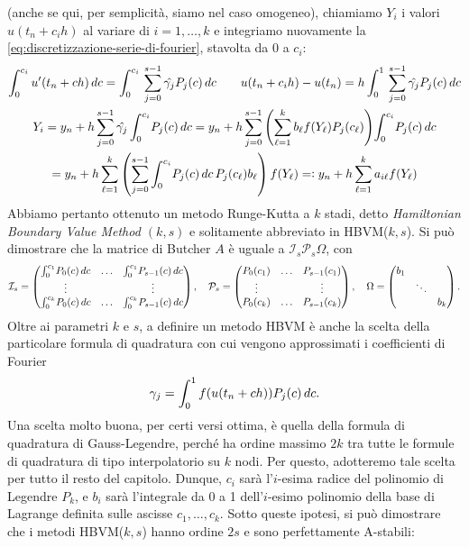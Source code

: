 (anche se qui, per semplicità, siamo nel caso omogeneo), chiamiamo $Y_i$
i valori $u(t_n + c_i h)$ al variare di $i = 1,\dots,k$ e integriamo nuovamente
la \eqref{eq:discretizzazione-serie-di-fourier}, stavolta da $0$ a $c_i$:
\begin{gather*}
\int_0^{c_i} u'(t_n+ch) \, dc
= \int_0^{c_i} \, \sum_{j=0}^{s-1} \hat{\gamma_j} P_j(c) \, dc
\qquad u(t_n + c_i h) - u(t_n)
= h \int_0^1 \, \sum_{j=0}^{s-1} \hat{\gamma_j} P_j(c) \, dc \\
Y_i
= y_n + h \sum_{j=0}^{s-1} \hat{\gamma_j} \int_0^{c_i} \! P_j(c) \, dc
= y_n + h \sum_{j=0}^{s-1}
	\left( \sum_{\ell=1}^k b_\ell f(Y_\ell) P_j(c_\ell) \right)
	\! \int_0^{c_i} \! P_j(c) \, dc \\
= y_n + h \sum_{\ell=1}^k
	\left( \sum_{j=0}^{s-1} \int_0^{c_i} \! P_j(c) \, dc \, P_j(c_\ell) b_\ell \right)
	f(Y_\ell)
=\vcentcolon y_n + h \sum_{\ell=1}^k a_{i\ell} f(Y_\ell)
\end{gather*}
Abbiamo pertanto ottenuto un metodo Runge-Kutta a $k$ stadi, detto
\emph{Hamiltonian Boundary Value Method $(k,s)$} e solitamente abbreviato in HBVM($k,s$).
Si può dimostrare che la matrice di Butcher $A$ è uguale a
$\mathcal{I}_s \mathcal{P}_s \Omega$, con
\begin{gather*}
\mathcal{I}_s = \begin{pmatrix}
\int_0^{c_1} \! P_{0}(c) \, dc & \hdots & \int_0^{c_1} \! P_{s-1}(c) \, dc \\ 
\vdots & & \vdots \\ 
\int_0^{c_k} \! P_{0}(c) \, dc & \hdots & \int_0^{c_k} \! P_{s-1}(c) \, dc
\end{pmatrix},
\quad \mathcal{P}_s = \begin{pmatrix}
P_0(c_1) & \hdots & P_{s-1}(c_1) \\
\vdots & & \vdots \\
P_0(c_k) & \hdots & P_{s-1}(c_k)
\end{pmatrix},
\quad \Omega = \begin{pmatrix}
b_1 & & \\
& \ddots & \\
& & b_k
\end{pmatrix}.
\end{gather*}
Oltre ai parametri $k$ e $s$, a definire un metodo HBVM è anche la scelta della
particolare formula di quadratura con cui vengono approssimati i coefficienti
di Fourier
\[
\gamma_j = \int_0^1 f(u(t_n+ch)) P_j(c) \, dc.
\]
Una scelta molto buona, per certi versi ottima, è quella della formula di
quadratura di Gauss-Legendre, perché ha ordine massimo $2k$ tra
tutte le formule di quadratura di tipo interpolatorio su $k$ nodi.
Per questo, adotteremo tale scelta per tutto il resto del capitolo.
Dunque, $c_i$ sarà l'$i$-esima radice del polinomio di Legendre $P_k$,
e $b_i$ sarà l'integrale da 0 a 1 dell'$i$-esimo polinomio della base
di Lagrange definita sulle ascisse $c_1,\dots,c_k$. Sotto queste ipotesi,
si può dimostrare che i metodi HBVM($k,s$) hanno ordine $2s$ e sono
perfettamente A-stabili:

